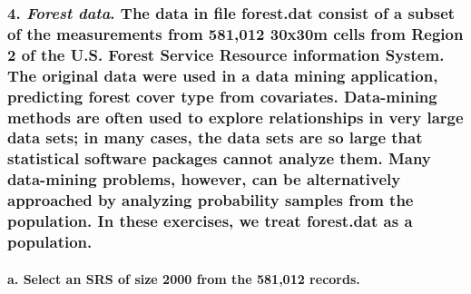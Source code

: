 \documentclass[12pt]{article}
\begin{document}
\subsubsection{\texorpdfstring{4. \emph{Forest data}. The data in file forest.dat consist of a subset of the measurements from 581,012 30x30m
cells from Region 2 of the U.S. Forest Service Resource information
System. The original data were used in a data mining application,
predicting forest cover type from covariates. Data-mining methods are
often used to explore relationships in very large data sets; in many
cases, the data sets are so large that statistical software packages
cannot analyze them. Many data-mining problems, however, can be
alternatively approached by analyzing probability samples from the
population. In these exercises, we treat forest.dat as a
population.}{4. Forest data. The data in file forest.dat are from kdd.ics.uci.edu/databases/covertype/covertype.data.html (Blackard, 1998). They consist of a subset of the measurements from 581,012 30x30m cells from Region 2 of the U.S. Forest Service Resource information System. The original data were used in a data mining application, predicting forest cover type from covariates. Data-mining methods are often used to explore relationships in very large data sets; in many cases, the data sets are so large that statistical software packages cannot analyze them. Many data-mining problems, however, can be alternatively approached by analyzing probability samples from the population. In these exercises, we treat forest.dat as a population.}}\label{forest-data.-the-data-in-file-forest.dat-are-from-kdd.ics.uci.edudatabasescovertypecovertype.data.html-blackard-1998.-they-consist-of-a-subset-of-the-measurements-from-581012-30x30m-cells-from-region-2-of-the-u.s.-forest-service-resource-information-system.-the-original-data-were-used-in-a-data-mining-application-predicting-forest-cover-type-from-covariates.-data-mining-methods-are-often-used-to-explore-relationships-in-very-large-data-sets-in-many-cases-the-data-sets-are-so-large-that-statistical-software-packages-cannot-analyze-them.-many-data-mining-problems-however-can-be-alternatively-approached-by-analyzing-probability-samples-from-the-population.-in-these-exercises-we-treat-forest.dat-as-a-population.} 

\paragraph{a. Select an SRS of size 2000 from the 581,012
records.}\label{a.-select-an-srs-of-size-2000-from-the-581012-records.}
\end{document}
